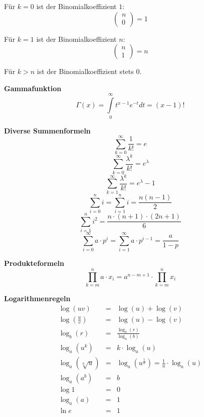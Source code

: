 \documentclass[10pt,a4paper,twocolumn]{article}
\begin{document}
Für $k=0$ ist der Binomialkoeffizient $1$:
\[
\left(
\begin{array}{c}
	n \\
	0
\end{array}
\right)=1
\]

Für $k=1$ ist der Binomialkoeffizient $n$:
\[
\left(
\begin{array}{c}
	n \\
	1
\end{array}
\right)=n
\]

Für $k>n$ ist der Binomialkoeffizient stets $0$.

\vspace{10pt}

\textbf{Gammafunktion}
\[
\Gamma(x) = \int\limits_{0}^{\infty}t^{x-1}e^{-t}dt=(x-1)!
\]

\vspace{10pt}

\textbf{Diverse Summenformeln}
\[
\sum\limits_{k=0}^{\infty}\frac{1}{k!}=e
\]
\[
\sum\limits_{k=0}^{\infty}\frac{\lambda^k}{k!}=e^{\lambda}
\]
\[
\sum\limits_{k=1}^{\infty}\frac{\lambda^k}{k!}=e^{\lambda}-1
\]
\[
\sum\limits_{i=0}^{n}i=\sum\limits_{i=1}^{n}i=\frac{n(n-1)}{2}
\]
\[
\sum\limits_{i=1}^{n}i^2=\frac{n\cdot (n+1)\cdot (2n+1)}{6}
\]
\[
\sum\limits_{i=0}^{\infty}a\cdot p^i=\sum\limits_{i=1}^{\infty}a\cdot p^{i-1}=\frac{a}{1-p}
\]

\vspace{10pt}

\textbf{Produkteformeln}
\[
\prod\limits_{k=m}^{n}a\cdot x_i = a^{n-m+1}\cdot\prod\limits_{k=m}^{n}x_i
\]

\vspace{10pt}

\textbf{Logarithmenregeln}
\[
\begin{array}{rcl}
	\log{(uv)} & = & \log{(u)}+\log{(v)} \\
	\log{(\frac{u}{v})} & = & \log{(u)}-\log{(v)} \\
	\log_b{(r)} & = & \frac{\log_a(r)}{\log_a{(b)}} \\
	\log_a{(u^k)} & = & k\cdot\log_a{(u)} \\
	\log_a{(\sqrt[n]{u})} & = & \log_a{(u^{\frac{1}{n}})}=\frac{1}{n}\cdot\log_a{(u)} \\
	\log_a{(a^b)} & = & b \\ 
	\log{1} & = & 0 \\
	\log_a{(a)} & = & 1 \\	
	\ln{e} & = & 1 \\
		
\end{array}
\]
\end{document}
